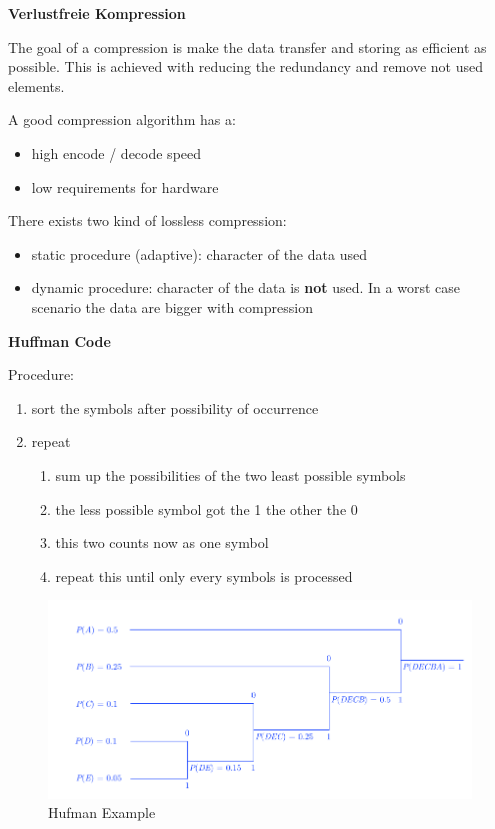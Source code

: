 \documentclass[11pt,twoside,twocolumn,landscape]{article}
\begin{document}
\textbf{Verlustfreie Kompression}

The goal of a compression is make the data transfer and storing as efficient as possible. This is achieved with reducing the redundancy and remove not used elements.

A good compression algorithm has a:
\begin{itemize}
\item high encode / decode speed
\item low requirements for hardware
\end{itemize}


There exists two kind of lossless compression:
\begin{itemize}
\item static procedure (adaptive): character of the data used
\item dynamic procedure: character of the data is \textbf{not} used. In a worst case scenario the data are bigger with compression
\end{itemize}


\textbf{Huffman Code}

Procedure:
\begin{enumerate}
\item sort the symbols after possibility of occurrence
\item repeat
\begin{enumerate}
\item sum up the possibilities of the two least possible symbols
\item the less possible symbol got the 1 the other the 0
\item this two counts now as one symbol
\item repeat this until only every symbols is processed
\end{enumerate}
\end{enumerate}


\begin{figure}[htbp]
\centering
\includegraphics[width=.9\linewidth]{img/hufman.png}
\caption{\label{fig:org5a4ff7f}Hufman Example}
\end{figure}
\end{document}

